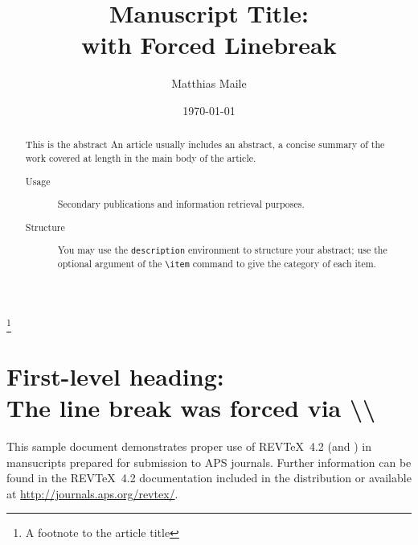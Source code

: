 \documentclass[%
 reprint,
 amsmath,amssymb,
 aps,
]{revtex4-2}
\begin{document}

\title{Manuscript Title:\\with Forced Linebreak}%
\thanks{A footnote to the article title}%

\author{Matthias Maile}

\date{\today}%

\begin{abstract}
  This is the abstract
  An article usually includes an abstract, a concise summary of the work
  covered at length in the main body of the article. 
  \begin{description}
    \item[Usage]
      Secondary publications and information retrieval purposes.
    \item[Structure]
      You may use the \texttt{description} environment to structure your abstract;
      use the optional argument of the \verb+\item+ command to give the category of each item. 
  \end{description}
\end{abstract}

\maketitle

\tableofcontents









\section{\label{sec:level1}First-level heading:\protect\\ The line
break was forced \lowercase{via} \textbackslash\textbackslash}

This sample document demonstrates proper use of REV\TeX~4.2 (and
\LaTeXe) in mansucripts prepared for submission to APS
journals. Further information can be found in the REV\TeX~4.2
documentation included in the distribution or available at
\url{http://journals.aps.org/revtex/}.
\end{document}
